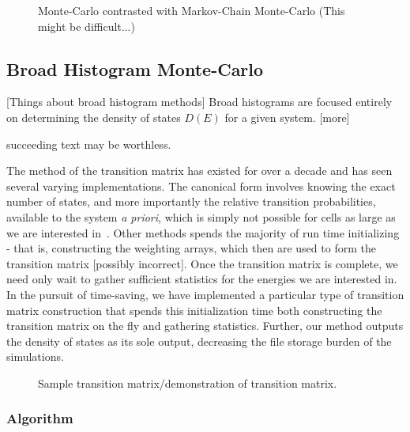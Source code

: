 \documentclass[12pt]{article}
\newcommand{\ignore}[1]{}
\begin{document}
\begin{figure}
    \caption{Monte-Carlo contrasted with Markov-Chain Monte-Carlo (This might be difficult...)}
\end{figure}
\ignore{\subsubsection{Histogram Methods}
Histograms are graphical representation of ``counting'' data. Monte Carlo histogram methods simply track the number of times the system has visited a particular energy. If the transition matrix 
\begin{figure}
    \caption{Sample histogram.}
\end{figure}}
\subsection{Broad Histogram Monte-Carlo}
[Things about broad histogram methods]
Broad histograms are focused entirely on determining the density of states $D(E)$ for a given system. [more]

{\color{red} succeeding text may be worthless.}


The method of the transition matrix has existed for over a decade and has seen several varying implementations. The canonical form involves knowing the exact number of states, and more importantly the relative transition probabilities, available to the system {\it a priori}, which is simply not possible for cells as large as we are interested in~\cite{perlinthesis}. Other methods spends the majority of run time initializing - that is, constructing the weighting arrays, which then are used to form the transition matrix [possibly incorrect]. Once the transition matrix is complete, we need only wait to gather sufficient statistics for the energies we are interested in. In the pursuit of time-saving, {\color{red} we have implemented a particular type of transition matrix construction that spends this initialization time both constructing the transition matrix on the fly and gathering statistics. Further, our method outputs the density of states as its sole output, decreasing the file storage burden of the simulations.}
\begin{figure}
    \caption{Sample transition matrix/demonstration of transition matrix.}
\end{figure}
\subsubsection{Algorithm}
\end{document}
